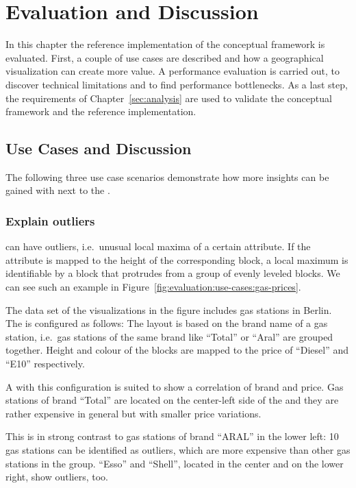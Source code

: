 \chapter{Evaluation and Discussion}\label{sec:evaluation}

In this chapter the reference implementation of the conceptual framework is evaluated.
First, a couple of use cases are described and how a geographical visualization can create more value.
A performance evaluation is carried out, to discover technical limitations and to find performance bottlenecks.
As a last step, the requirements of Chapter~\ref{sec:analysis} are used to validate the conceptual framework and the reference implementation.

\section{Use Cases and Discussion}\label{sec:use-case}

The following three use case scenarios demonstrate how more insights can be gained with \gv{} next to the \tmap{}.

\subsection{Explain outliers}\label{sec:evaluation:use-cases:gas-stations}

\tmaps{} can have outliers, i.e.\ unusual local maxima of a certain attribute.
If the attribute is mapped to the height of the corresponding block, a local maximum is identifiable by a block that protrudes from a group of evenly leveled blocks.
We can see such an example in Figure~\ref{fig:evaluation:use-cases:gas-prices}.

The data set of the visualizations in the figure includes gas stations in Berlin.
The \tmap{} is configured as follows:
The layout is based on the brand name of a gas station, i.e.\ gas stations of the same brand like ``Total'' or ``Aral'' are grouped together.
Height and colour of the blocks are mapped to the price of ``Diesel'' and ``E10'' respectively.

A \tmap{} with this configuration is suited to show a correlation of brand and price.
Gas stations of brand ``Total'' are located on the center-left side of the \tmap{} and they are rather expensive in general but with smaller price variations.

This is in strong contrast to gas stations of brand ``ARAL'' in the lower left:
10 gas stations can be identified as outliers, which are more expensive than other gas stations in the group.
``Esso'' and ``Shell'', located in the center and on the lower right, show outliers, too.

